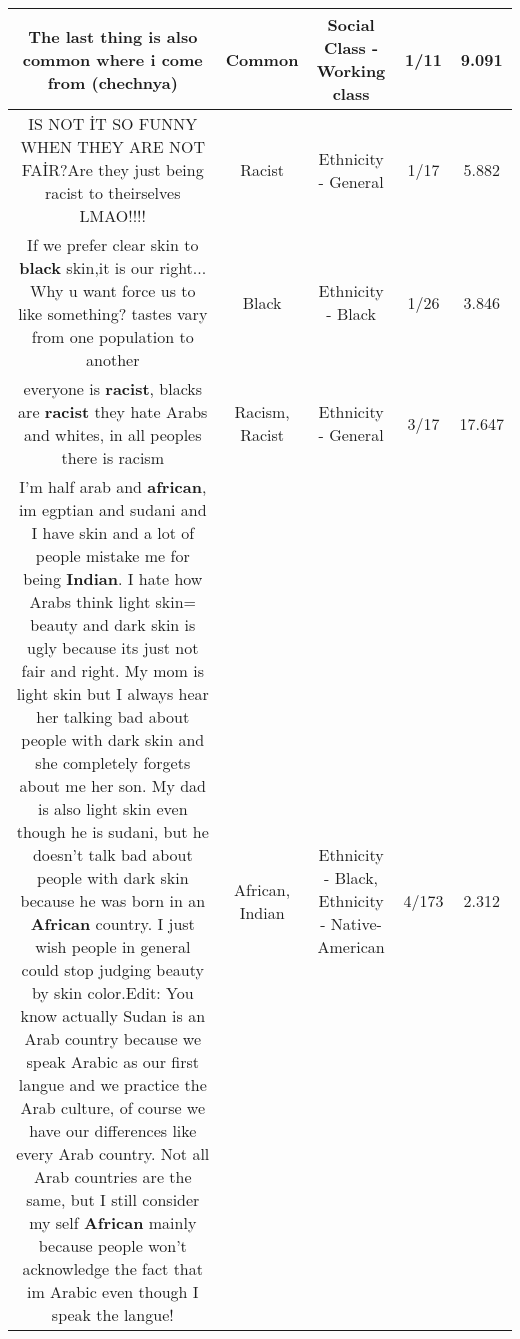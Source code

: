 \documentclass[11pt]{article}
\newlength\mylength
\begin{document}
\begin{center}
\begin{longtable}{|C{.65\mylength}|C{.30\mylength}|C{.12\mylength}|C{.12\mylength}|C{.12\mylength}|}
  \small The last thing is also \textbf{common} where i come from (chechnya)\normalsize   & Common & Social Class - Working class & 1/11 & 9.091 \\  \hline
  \small IS NOT İT SO FUNNY WHEN THEY ARE NOT FAİR?Are they  just being racist to theirselves LMAO!!!!\normalsize   & Racist & Ethnicity - General & 1/17 & 5.882 \\  \hline
  \small If we prefer clear skin to \textbf{black} skin,it is our right... Why u want force us to like something? tastes vary from one population to another\normalsize   & Black & Ethnicity - Black & 1/26 & 3.846 \\  \hline
  \small everyone is \textbf{racist}, blacks are \textbf{racist} they hate Arabs and whites, in all peoples there is racism\normalsize   & Racism, Racist & Ethnicity - General & 3/17 & 17.647 \\  \hline
  \small I'm half arab and \textbf{african}, im egptian and sudani and I have skin and a lot of people mistake me for being \textbf{Indian}. I hate how Arabs think light skin= beauty and dark skin is ugly because its just not fair and right. My mom is light skin but I always hear her talking bad about people with dark skin and she completely forgets about me her son. My dad is also light skin even though he is sudani, but he doesn't talk bad about people with dark skin because he was born in an \textbf{African} country. I just wish people in general could stop judging beauty by skin color.Edit:  You know actually Sudan is an Arab country because we speak Arabic as our first langue and we practice the Arab culture, of course we have our differences like every Arab country. Not all Arab countries are the same, but I still consider my self \textbf{African} mainly because people won't acknowledge the fact that im Arabic even though I speak the langue!\normalsize   & African, Indian & Ethnicity - Black, Ethnicity - Native-American & 4/173 & 2.312 \\  \hline

\end{longtable}
\end{center}
\end{document}
